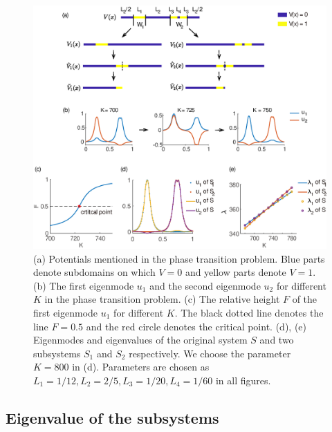\documentclass[a4paper,11pt]{article}
\begin{document}
\begin{figure}
\centering
\includegraphics[width=\linewidth]{Fig5.eps}
\caption{(a) Potentials mentioned in the phase transition problem. Blue parts denote subdomains on which $V = 0$ and yellow parts denote $V = 1$. (b) The first eigenmode $u_1$ and the second eigenmode $u_2$ for different $K$ in the phase transition problem. (c) The relative height $F$ of the first eigenmode $u_1$ for different $K$. The black dotted line denotes the line $F = 0.5$ and the red circle denotes the critical point. (d), (e) Eigenmodes and eigenvalues of the original system $S$ and two subsystems $S_1$ and $S_2$ respectively. We choose the parameter $K = 800$ in (d). Parameters are chosen as $L_1 = 1/12, L_2 = 2/5, L_3= 1/20, L_4 = 1/60$ in all figures.}
\label{fig5}
\end{figure}

\subsection{Eigenvalue of the subsystems}
\end{document}
